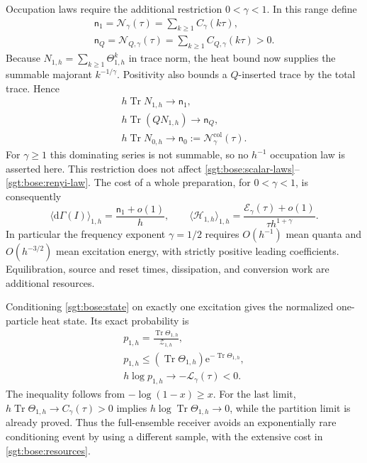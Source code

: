 \documentclass[aps,pra,reprint,superscriptaddress,longbibliography]{revtex4-2}
\newcommand{\Tr}{\operatorname{Tr}}
\newcommand{\ee}{\mathrm e}
\begin{document}
Occupation laws require the additional restriction $0<\gamma<1$.
In this range define
\begin{equation}
\begin{gathered}
 \mathsf n_1=\mathcal N_\gamma(\tau)=\sum_{k\ge1}C_\gamma(k\tau),
 \\
 \mathsf n_Q=\mathcal N_{Q,\gamma}(\tau)
      =\sum_{k\ge1}C_{Q,\gamma}(k\tau)>0.
 \label{sgt:bose:number-coefficients}
\end{gathered}
\end{equation}
Because $N_{1,h}=\sum_{k\ge1}\Theta_{1,h}^k$ in trace norm, the heat
bound now supplies the summable majorant $k^{-1/\gamma}$.  Positivity
also bounds a $Q$-inserted trace by the total trace.  Hence
\begin{equation}
\begin{gathered}
 h\Tr N_{1,h}\longrightarrow \mathsf n_1,
 \\
 h\Tr(QN_{1,h})\longrightarrow \mathsf n_Q,
 \\
 h\Tr N_{0,h}\longrightarrow \mathsf n_0
      :=\mathcal N^{\mathrm{col}}_\gamma(\tau).
 \label{sgt:bose:number-law}
\end{gathered}
\end{equation}
For $\gamma\ge1$ this dominating series is not summable, so no
$h^{-1}$ occupation law is asserted here.  This restriction does not
affect \eqref{sgt:bose:scalar-laws}--\eqref{sgt:bose:renyi-law}.
The cost of a whole preparation, for $0<\gamma<1$, is consequently
\begin{equation}
 \langle\mathrm d\Gamma(I)\rangle_{1,h}
     =\frac{\mathsf n_1+o(1)}h,
 \qquad
 \langle\mathcal H_{1,h}\rangle_{1,h}
     =\frac{\mathcal E_\gamma(\tau)+o(1)}{\tau h^{1+\gamma}}.
 \label{sgt:bose:resources}
\end{equation}
In particular the frequency exponent $\gamma=1/2$ requires
$O(h^{-1})$ mean quanta and $O(h^{-3/2})$ mean excitation energy, with
strictly positive leading coefficients.  Equilibration, source and
reset times, dissipation, and conversion work are additional resources.

Conditioning \eqref{sgt:bose:state} on exactly one excitation gives
the normalized one-particle heat state.  Its exact probability is
\begin{equation}
\begin{gathered}
 p_{1,h}=\frac{\Tr\Theta_{1,h}}{\mathcal Z_{1,h}},
 \\
 p_{1,h}\le(\Tr\Theta_{1,h})\ee^{-\Tr\Theta_{1,h}},
 \\
 h\log p_{1,h}\longrightarrow-\mathcal L_\gamma(\tau)<0.
 \label{sgt:bose:postselection}
\end{gathered}
\end{equation}
The inequality follows from $-\log(1-x)\ge x$.  For the last limit,
$h\Tr\Theta_{1,h}\to C_\gamma(\tau)>0$ implies
$h\log\Tr\Theta_{1,h}\to0$, while the partition limit is already
proved.  Thus the full-ensemble receiver avoids an exponentially rare
conditioning event by using a different sample, with the extensive
cost in \eqref{sgt:bose:resources}.
\end{document}
